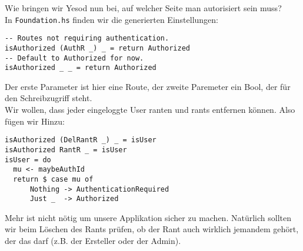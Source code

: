 \documentclass{beamer}
\begin{document}
\begin{frame}[fragile]
Wie bringen wir Yesod nun bei, auf welcher Seite man autorisiert sein muss?\\\pause
In \texttt{Foundation.hs} finden wir die generierten Einstellungen:
\begin{verbatim}
-- Routes not requiring authentication.
isAuthorized (AuthR _) _ = return Authorized
-- Default to Authorized for now.
isAuthorized _ _ = return Authorized
\end{verbatim}
\pause
Der erste Parameter ist hier eine Route, der zweite Paremeter ein Bool, der für den Schreibzugriff steht.\\\pause
Wir wollen, dass jeder eingeloggte User ranten und rants entfernen können. Also fügen wir Hinzu:
\begin{verbatim}
isAuthorized (DelRantR _) _ = isUser
isAuthorized RantR _ = isUser
isUser = do
  mu <- maybeAuthId
  return $ case mu of
      Nothing -> AuthenticationRequired
      Just _  -> Authorized
\end{verbatim}
\end{frame}

\begin{frame}
Mehr ist nicht nötig um unsere Applikation sicher zu machen. Natürlich sollten wir beim Löschen des Rants prüfen, ob der Rant auch wirklich jemandem gehört, der das darf (z.B. der Ersteller oder der Admin).
\end{frame}
\end{document}

